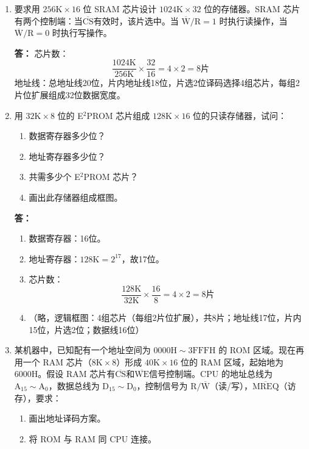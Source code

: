 \documentclass{article}
\begin{document}
\begin{enumerate}[label=\arabic*.]
    \item 要求用 $256\text{K}\times16$ 位 SRAM 芯片设计 $1024\text{K}\times32$ 位的存储器。SRAM 芯片有两个控制端：当$\overline{\text{CS}}$有效时，该片选中。当 $\overline{\text{W}}/\text{R}=1$ 时执行读操作，当 $\overline{\text{W}}/\text{R}=0$ 时执行写操作。
    
    \textbf{答：}
    芯片数：
    \[
    \frac{1024\text{K}}{256\text{K}} \times \frac{32}{16} = 4 \times 2 = 8 \text{片}
    \]
    地址线：总地址线20位，片内地址线18位，片选2位译码选择4组芯片，每组2片位扩展组成32位数据宽度。

    \item 用 $32\text{K}\times8$ 位的 E$^2$PROM 芯片组成 $128\text{K}\times16$ 位的只读存储器，试问：
    \begin{enumerate}[label=(\arabic*)]
        \item 数据寄存器多少位？
        \item 地址寄存器多少位？
        \item 共需多少个 E$^2$PROM 芯片？
        \item 画出此存储器组成框图。
    \end{enumerate}
    
    \textbf{答：}
    \begin{enumerate}[label=(\arabic*)]
        \item 数据寄存器：16位。
        \item 地址寄存器：$128\text{K}=2^{17}$，故17位。
        \item 芯片数：
        \[
        \frac{128\text{K}}{32\text{K}} \times \frac{16}{8} = 4 \times 2 = 8 \text{片}
        \]
        \item （略，逻辑框图：4组芯片（每组2片位扩展），共8片；地址线17位，片内15位，片选2位；数据线16位）
    \end{enumerate}

    \item 某机器中，已知配有一个地址空间为 $0000\text{H}\sim3\text{FFFH}$ 的 ROM 区域。现在再用一个 RAM 芯片（$8\text{K}\times8$）形成 $40\text{K}\times16$ 位的 RAM 区域，起始地为 $6000\text{H}$。假设 RAM 芯片有$\overline{\text{CS}}$和$\overline{\text{WE}}$信号控制端。CPU 的地址总线为 $\text{A}_{15}\sim\text{A}_0$，数据总线为 $\text{D}_{15}\sim\text{D}_0$，控制信号为 $\text{R}/\overline{\text{W}}$（读/写），$\overline{\text{MREQ}}$（访存），要求：
    \begin{enumerate}[label=(\arabic*)]
        \item 画出地址译码方案。
        \item 将 ROM 与 RAM 同 CPU 连接。
    \end{enumerate}
    

\end{enumerate}
\end{document}
